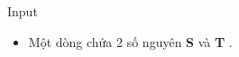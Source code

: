 Input
\begin{itemize}
	\item     Một dòng chứa 2 số nguyên    \textbf{     S    }    và    \textbf{     T    }    .   
\end{itemize}